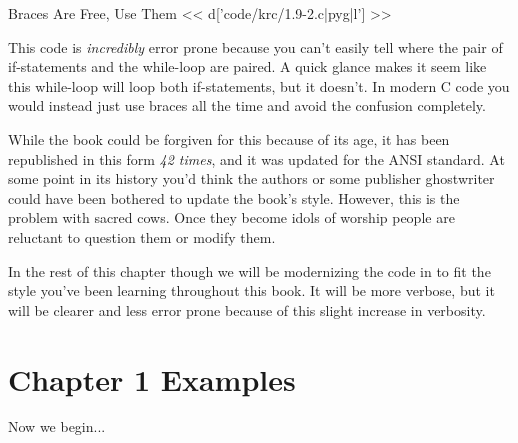 \begin{code}{Braces Are Free, Use Them}
<< d['code/krc/1.9-2.c|pyg|l'] >>
\end{code}

This code is \emph{incredibly} error prone because you can't easily tell
where the pair of if-statements and the while-loop are paired.  A quick
glance makes it seem like this while-loop will loop both if-statements,
but it doesn't.  In modern C code you would instead just use braces all
the time and avoid the confusion completely.

While the book could be forgiven for this because of its age, it has been
republished in this form \emph{42 times}, and it was updated for the ANSI
standard.  At some point in its history you'd think the authors or some
publisher ghostwriter could have been bothered to update the book's style.
However, this is the problem with sacred cows.  Once they become idols of
worship people are reluctant to question them or modify them.

In the rest of this chapter though we will be modernizing the code in \krc
to fit the style you've been learning throughout this book.  It will be
more verbose, but it will be clearer and less error prone because of
this slight increase in verbosity.


\section{Chapter 1 Examples}

Now we begin...
